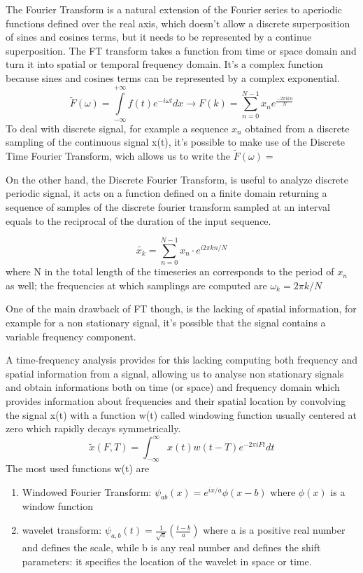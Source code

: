 \documentclass[a4paper,11pt]{article}
\begin{document}
The Fourier Transform is a natural extension of the Fourier series to aperiodic functions defined over the real axis, which doesn't allow a discrete superposition of sines and cosines terms, but it needs to be represented by a continue superposition.
The FT transform takes a function from time or space domain and turn it into spatial or temporal frequency domain.
It's a complex function because sines and cosines terms can be represented by a complex exponential.
\begin{equation}
\tilde{F}(\omega) = \int\limits_{-\infty}^{+\infty} f(t)e^{-i \omega t} dx \longrightarrow F(k) = \sum_{n = 0}^{N-1}x_n e^{\frac{-2\pi i k n}{N}}
\end{equation}
To deal with discrete signal, for example a sequence $x_n$ obtained from a discrete sampling of the continuous signal x(t), it's possible to make use of the Discrete Time Fourier Transform, wich allows us to write the $\tilde F(\omega) = $

On the other hand, the Discrete Fourier Transform, is useful to analyze discrete periodic signal, it acts on a function defined on a finite domain returning a sequence of samples of the discrete fourier transform sampled at an interval equals to the reciprocal of the duration of the input sequence.

\begin{equation}
\tilde{x_k} = \sum_{n=0}^{N-1} x_n \cdot e^{i 2\pi kn/N}
\end{equation}
where N in the total length of the timeseries an corresponds to the period of $x_n$ as well; the frequencies at which samplings are computed are $\omega_k = 2\pi k/N$

One of the main drawback of FT though, is the lacking of spatial information, for example for a non stationary signal, it's possible that the signal contains a variable frequency component.

A time-frequency analysis provides for this lacking computing both frequency and spatial information from a signal, allowing us to analyse non stationary signals and obtain informations both on time (or space) and frequency domain which provides information about frequencies and their spatial location by convolving the signal x(t) with a function w(t) called windowing function usually centered at zero which rapidly decays symmetrically.
\begin{equation}
\tilde{x}(F, T) = \int_{-\infty}^{\infty} x(t)w(t-T) e^{-2\pi i F t} dt
\end{equation}
The most used functions w(t) are
\begin{enumerate}
\item Windowed Fourier Transform: $\psi_{ab}(x) = e^{ix/a}\phi(x-b)$ where $\phi(x)$ is a window function
\item wavelet transform: $\psi_{a, b}\left(t\right) = \frac{1}{\sqrt{a}}\left(\frac{t-b}{a}\right)$ where a is a positive real number and defines the scale, while b is any real number and defines the shift parameters: it specifies the location of the wavelet in space or time.
\end{enumerate}
\end{document}
